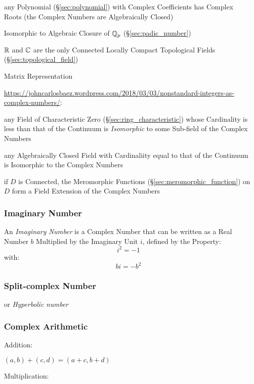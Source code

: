 any Polynomial (\S\ref{sec:polynomial}) with Complex Coefficients has Complex
Roots (the Complex Numbers are Algebraically Closed)

Isomorphic to Algebraic Closure of $\mathbb{Q}_p$ (\S\ref{sec:padic_number})

$\mathbb{R}$ and $\mathbb{C}$ are the only Connected Locally Compact
Topological Fields (\S\ref{sec:topological_field})

Matrix Representation %

\url{https://johncarlosbaez.wordpress.com/2018/03/03/nonstandard-integers-as-complex-numbers/}:

any Field of Characteristic Zero (\S\ref{sec:ring_characteristic}) whose
Cardinality is less than that of the Continuum is \emph{Isomorphic} to some
Sub-field of the Complex Numbers

any Algebraically Closed Field with Cardinaliity equal to that of the Continuum
is Isomorphic to the Complex Numbers

if $D$ is Connected, the Meromorphic Functions
(\S\ref{sec:meromorphic_function}) on $D$ form a Field Extension of the Complex
Numbers



\subsubsection{Imaginary Number}\label{sec:imaginary_number}

An \emph{Imaginary Number} is a Complex Number that can be written as a Real
Number $b$ Multiplied by the Imaginary Unit $i$, defined by the Property:
\[
  i^2 = -1
\]
with:
\[
  bi = -b^2
\]



\subsubsection{Split-complex Number}\label{sec:split_complex}

or \emph{Hyperbolic number}



\subsubsection{Complex Arithmetic}\label{sec:complex_arithmetic}

Addition:

$(a,b) + (c,d) = (a + c, b + d)$

Multiplication:

